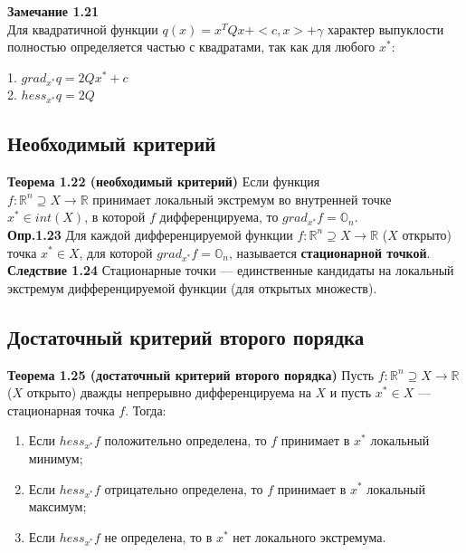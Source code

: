 {\bf Замечание 1.21} \\ Для квадратичной функции $q(x)=x^TQx+<c,x>+\gamma$ характер выпуклости полностью определяется частью с квадратами, так как для любого $x^*:$
\begin{center}1. $grad_{x^*}q=2Qx^*+c$\\ 2. $hess_{x^*}q=2Q$ \end{center}









\subsection{Необходимый критерий}
{\bf Теорема 1.22 (необходимый критерий)}
Если функция\\ $f:\mathbb{R}^n \supseteq X \to \mathbb{R}$ принимает локальный экстремум во внутренней точке $x^* \in int(X)$, в которой $f$ дифференцируема, то $grad_{x^*}f=\mathbb{O}_n$.\\

{\bf Опр.1.23}
Для каждой дифференцируемой функции $f:\mathbb{R}^n \supseteq X \to \mathbb{R}$ ($X$ открыто) точка $x^* \in X$, для которой $grad_{x^*}f=\mathbb{O}_n$, называется {\bf стационарной точкой}.\\

{\bf Следствие 1.24}
Стационарные точки --- единственные кандидаты на локальный экстремум дифференцируемой функции (для открытых множеств).\\

\subsection{Достаточный критерий второго порядка}
{\bf Теорема 1.25 (достаточный критерий второго порядка)}
Пусть $f:\mathbb{R}^n \supseteq X \to \mathbb{R}$ ($X$ открыто) дважды непрерывно дифференцируема на $X$ и пусть $x^* \in X$ --- стационарная точка $f$. Тогда:
\begin{enumerate}
\item Если $hess_{x^*}f$ положительно определена, то $f$ принимает в $x^*$ локальный минимум;
\item Если $hess_{x^*}f$ отрицательно определена, то $f$ принимает в $x^*$ локальный максимум;
\item Если $hess_{x^*}f$ не определена, то в $x^*$ нет локального экстремума.
\end{enumerate}

